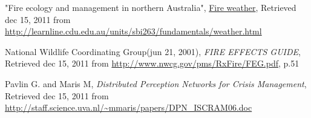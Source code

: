 \begin{thebibliography}{4}
 "Fire ecology and management in northern Australia", \underline{Fire weather}, Retrieved dec 15, 2011 from \url{http://learnline.cdu.edu.au/units/sbi263/fundamentals/weather.html}

 National Wildlife Coordinating Group(jun 21, 2001), \emph{FIRE EFFECTS GUIDE}, Retrieved dec 15, 2011 from \url{http://www.nwcg.gov/pms/RxFire/FEG.pdf}, p.51

 Pavlin G. and Maris M, \emph{Distributed Perception Networks for Crisis Management}, Retrieved dec 15, 2011 from \url{http://staff.science.uva.nl/~mmaris/papers/DPN_ISCRAM06.doc}

\end{thebibliography}
